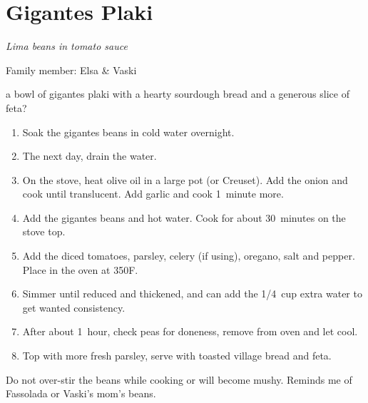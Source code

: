 \chapter{Gigantes Plaki}
\label{ch:gigantes-plaki}


\textit{Lima beans in tomato sauce}

Family member: Elsa \& Vaski


 a bowl of gigantes plaki with a hearty sourdough bread and a generous slice of feta?

\bigskip

\begin{enumerate}
    \item Soak the gigantes beans in cold water overnight.
    \item The next day, drain the water.
    \item On the stove, heat olive oil in a large pot (or Creuset). Add the onion and cook until translucent. Add garlic and cook 1~minute more.
    \item Add the gigantes beans and hot water. Cook for about 30~minutes on the stove top.
    \item Add the diced tomatoes, parsley, celery (if using), oregano, salt and pepper. Place in the oven at 350\degree F.
    \item Simmer until reduced and thickened, and can add the 1/4~cup extra water to get wanted consistency.
    \item After about 1~hour, check peas for doneness, remove from oven and let cool.
    \item Top with more fresh parsley, serve with toasted village bread and feta.
\end{enumerate}

Do not over-stir the beans while cooking or will become mushy.
Reminds me of Fassolada or Vaski's mom's beans.

